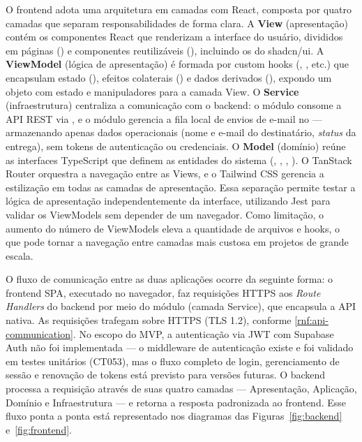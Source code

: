 O frontend adota uma arquitetura em camadas com React, composta por quatro camadas que separam responsabilidades de forma clara. A \textbf{View} (apresentação) contém os componentes React que renderizam a interface do usuário, divididos em páginas () e componentes reutilizáveis (), incluindo os do shadcn/ui. A \textbf{ViewModel} (lógica de apresentação) é formada por custom hooks (, , etc.) que encapsulam estado (), efeitos colaterais () e dados derivados (), expondo um objeto com estado e manipuladores para a camada View. O \textbf{Service} (infraestrutura) centraliza a comunicação com o backend: o módulo  consome a API REST via , e o módulo  gerencia a fila local de envios de e-mail no  --- armazenando apenas dados operacionais (nome e e-mail do destinatário, \textit{status} da entrega), sem tokens de autenticação ou credenciais. O \textbf{Model} (domínio) reúne as interfaces TypeScript que definem as entidades do sistema (, , , ). O TanStack Router orquestra a navegação entre as Views, e o Tailwind CSS gerencia a estilização em todas as camadas de apresentação. Essa separação permite testar a lógica de apresentação independentemente da interface, utilizando Jest para validar os ViewModels sem depender de um navegador. Como limitação, o aumento do número de ViewModels eleva a quantidade de arquivos e hooks, o que pode tornar a navegação entre camadas mais custosa em projetos de grande escala.

O fluxo de comunicação entre as duas aplicações ocorre da seguinte forma: o frontend SPA, executado no navegador, faz requisições HTTPS aos \textit{Route Handlers} do backend por meio do módulo  (camada Service), que encapsula a  API nativa. As requisições trafegam sobre HTTPS (TLS 1.2), conforme \ref{rnf:api-communication}. No escopo do MVP, a autenticação via JWT com Supabase Auth não foi implementada --- o middleware de autenticação existe e foi validado em testes unitários (CT053), mas o fluxo completo de login, gerenciamento de sessão e renovação de tokens está previsto para versões futuras. O backend processa a requisição através de suas quatro camadas --- Apresentação, Aplicação, Domínio e Infraestrutura --- e retorna a resposta padronizada ao frontend. Esse fluxo ponta a ponta está representado nos diagramas das Figuras~\ref{fig:backend} e~\ref{fig:frontend}.


